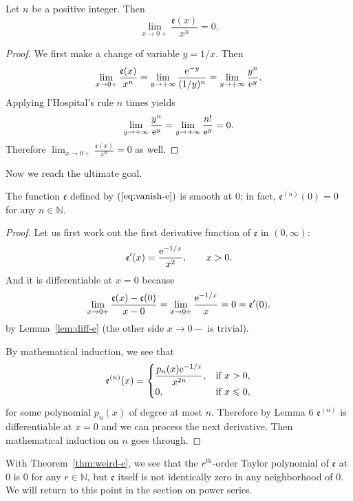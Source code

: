\begin{lem}
  \label{lem:diff-e}
  Let $n$ be a positive integer.
  Then
  \[
    \lim_{x \to 0+} \frac{ \mathfrak{e}(x) }{ x^n } = 0.
  \]
\end{lem}

\begin{proof}
  We first make a change of variable $y = 1/x$.
  Then
  \[
    \lim_{x \to 0+} \frac{ \mathfrak{e}(x) }{ x^n } = \lim_{y \to +\infty} \frac{ \mathrm e^{-y} }{ (1/y)^n } = \lim_{y \to +\infty} \frac{ y^n }{ \mathrm e^y }.
  \]
  Applying l'Hospital's rule $n$ times yields
  \[
    \lim_{y \to +\infty} \frac{ y^n }{ \mathrm e^y } = \lim_{y \to +\infty} \frac{n!}{ \mathrm e^y } = 0.
  \]
  Therefore $\displaystyle \lim_{x \to 0+} \frac{ \mathfrak{e}(x) }{ x^n } = 0$ as well.
\end{proof}

Now we reach the ultimate goal.
\begin{thm}
  \label{thm:weird-e}
  The function $\mathfrak{e}$ defined by $(\ref{eq:vanish-e})$ is smooth at $0$; in fact, $\mathfrak{e}^{(n)}(0) = 0$ for any $n \in \mathbb{N}$.
\end{thm}

\begin{proof}
  Let us first work out the first derivative function of $\mathfrak{e}$ in $(0, \infty)$:
  \[
    \mathfrak{e}'(x) = \frac{ \mathrm e^{-1/x} }{x^2}, \qquad x > 0.
  \]
  And it is differentiable at $x=0$ because
  \[
    \lim_{x \to 0+} \frac{ \mathfrak{e}(x) - \mathfrak{e}(0) }{ x - 0 }
    = \lim_{x \to 0+} \frac{ \mathrm e^{-1/x} }{ x } = 0 = \mathfrak{e}'(0).
  \]
  by Lemma~\ref{lem:diff-e} (the other side $x \to 0-$ is trivial).
  
  By mathematical induction, we see that
  \[
    \mathfrak{e}^{(n)}(x) = 
    \begin{cases}
      \dfrac{ p_n(x) \mathrm e^{-1/x} }{ x^{2n} }, & \text{if $x > 0$}, \\
      0                                    , & \text{if $x \leqslant 0$},
    \end{cases}
  \]
  for some polynomial $p_n(x)$ of degree at most $n$.
  Therefore by Lemma 6 $\mathfrak{e}^{(n)}$ is differentiable at $x = 0$ and we can process the next derivative.  Then mathematical induction on $n$ goes through.
\end{proof}

With Theorem~\ref{thm:weird-e}, we see that the $r^{\text{th}}$-order Taylor polynomial of $\mathfrak{e}$ at $0$ is $0$ for any $r \in \mathbb{N}$, but $\mathfrak{e}$ itself is not identically zero in any neighborhood of $0$.
We will return to this point in the section on power series.

